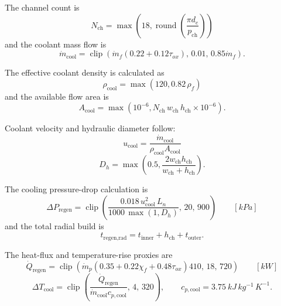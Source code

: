 \documentclass[11pt]{article}
\newcommand{\clip}{\operatorname{clip}}
\newcommand{\mdot}{\dot{m}}
\newcommand{\mdotp}{\dot{m}_{p}}
\newcommand{\mdotf}{\dot{m}_{f}}
\begin{document}
The channel count is
\begin{equation}
N_{\text{ch}}=\max\!\left(18,\operatorname{round}\!\left(\frac{\pi d_e}{p_{\text{ch}}}\right)\right)
\label{eq:regen-count}
\end{equation}
and the coolant mass flow is
\begin{equation}
\mdot_{\text{cool}}
=
\clip\!\left(
\mdotf(0.22+0.12\tau_{ox}),
\,
0.01,\,
0.85\mdotf
\right).
\label{eq:regen-mdot}
\end{equation}

The effective coolant density is calculated as
\begin{equation}
\rho_{\text{cool}}=\max(120,0.82\,\rho_f)
\label{eq:coolant-density}
\end{equation}
and the available flow area is
\begin{equation}
A_{\text{cool}}=\max\!\left(10^{-6},N_{\text{ch}}\,w_{\text{ch}}\,h_{\text{ch}}\times 10^{-6}\right).
\label{eq:coolant-area}
\end{equation}

Coolant velocity and hydraulic diameter follow:
\begin{equation}
u_{\text{cool}}=\frac{\mdot_{\text{cool}}}{\rho_{\text{cool}}A_{\text{cool}}}
\label{eq:coolant-velocity}
\end{equation}
\begin{equation}
D_h=\max\!\left(0.5,\frac{2w_{\text{ch}}h_{\text{ch}}}{w_{\text{ch}}+h_{\text{ch}}}\right).
\label{eq:hydraulic-diameter}
\end{equation}

The cooling pressure-drop calculation is
\begin{equation}
\Delta P_{\text{regen}}
=
\clip\!\left(
\frac{0.018\,u_{\text{cool}}^2\,L_n}{1000\,\max(1,D_h)},
\,
20,\,
900
\right)
\qquad [\si{kPa}]
\label{eq:regen-dp}
\end{equation}
and the total radial build is
\begin{equation}
t_{\text{regen,rad}}=t_{\text{inner}}+h_{\text{ch}}+t_{\text{outer}}.
\label{eq:regen-radial}
\end{equation}

The heat-flux and temperature-rise proxies are
\begin{equation}
\dot{Q}_{\text{regen}}
=
\clip\!\left(
\mdotp\left(0.35+0.22\chi_f+0.48\tau_{ox}\right)410,
\,
18,\,
720
\right)
\qquad [\si{kW}]
\label{eq:regen-heat}
\end{equation}
\begin{equation}
\Delta T_{\text{cool}}
=
\clip\!\left(
\frac{\dot{Q}_{\text{regen}}}{\mdot_{\text{cool}}c_{p,\text{cool}}},
\,
4,\,
320
\right),
\qquad
c_{p,\text{cool}}=3.75\ \si{kJ\,kg^{-1}\,K^{-1}}.
\label{eq:regen-dt}
\end{equation}
\end{document}
